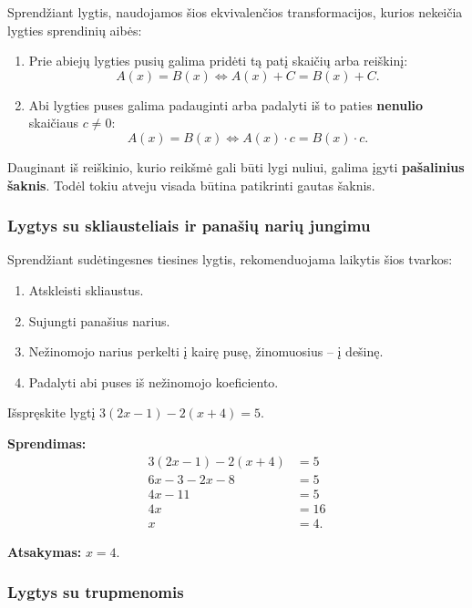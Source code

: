 Sprendžiant lygtis, naudojamos šios ekvivalenčios transformacijos, kurios nekeičia lygties sprendinių aibės:

\begin{enumerate}
    \item Prie abiejų lygties pusių galima pridėti tą patį skaičių arba reiškinį:
    \[
        A(x) = B(x) \iff A(x) + C = B(x) + C.
    \]
    \item Abi lygties puses galima padauginti arba padalyti iš to paties \textbf{nenulio} skaičiaus $c \neq 0$:
    \[
        A(x) = B(x) \iff A(x) \cdot c = B(x) \cdot c.
    \]
\end{enumerate}

\begin{remark}
Dauginant iš reiškinio, kurio reikšmė gali būti lygi nuliui, galima įgyti \textbf{pašalinius šaknis}. Todėl tokiu atveju visada būtina patikrinti gautas šaknis.
\end{remark}

\subsubsection{Lygtys su skliausteliais ir panašių narių jungimu}

Sprendžiant sudėtingesnes tiesines lygtis, rekomenduojama laikytis šios tvarkos:
\begin{enumerate}
    \item Atskleisti skliaustus.
    \item Sujungti panašius narius.
    \item Nežinomojo narius perkelti į kairę pusę, žinomuosius – į dešinę.
    \item Padalyti abi puses iš nežinomojo koeficiento.
\end{enumerate}

\begin{example}
Išspręskite lygtį $3(2x - 1) - 2(x + 4) = 5$.

\textbf{Sprendimas:}
\begin{align*}
    3(2x - 1) - 2(x + 4) &= 5 \\
    6x - 3 - 2x - 8 &= 5 \\
    4x - 11 &= 5 \\
    4x &= 16 \\
    x &= 4.
\end{align*}

\textbf{Atsakymas:} $x = 4$.
\end{example}

\subsubsection{Lygtys su trupmenomis}

